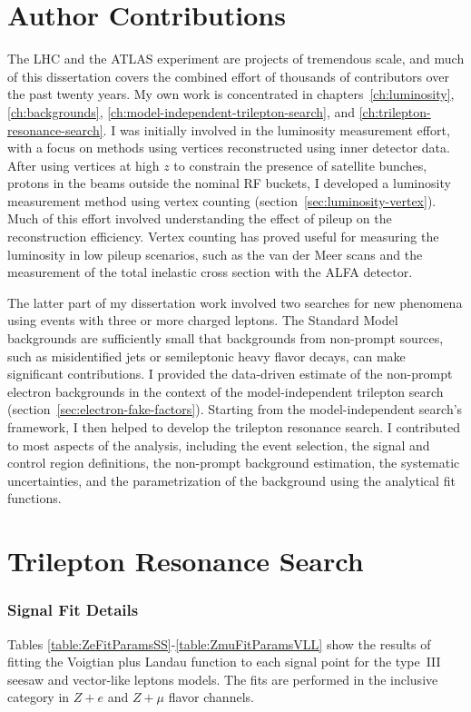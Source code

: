 \begin{appendices}

\chapter{Author Contributions}
The LHC and the ATLAS experiment are projects of tremendous scale, and much of this dissertation covers the combined effort of thousands of contributors over the past twenty years. My own work is concentrated in chapters~\ref{ch:luminosity}, \ref{ch:backgrounds}, \ref{ch:model-independent-trilepton-search}, and \ref{ch:trilepton-resonance-search}. I was initially involved in the luminosity measurement effort, with a focus on methods using vertices reconstructed using inner detector data. After using vertices at high $z$ to constrain the presence of satellite bunches, protons in the beams outside the nominal RF buckets, I developed a luminosity measurement method using vertex counting (section~\ref{sec:luminosity-vertex}). Much of this effort involved understanding the effect of pileup on the reconstruction efficiency. Vertex counting has proved useful for measuring the luminosity in low pileup scenarios, such as the van der Meer scans and the measurement of the total inelastic cross section with the ALFA detector. 

The latter part of my dissertation work involved two searches for new phenomena using events with three or more charged leptons. The Standard Model backgrounds are sufficiently small that backgrounds from non-prompt sources, such as misidentified jets or semileptonic heavy flavor decays, can make significant contributions. I provided the data-driven estimate of the non-prompt electron backgrounds in the context of the model-independent trilepton search (section~\ref{sec:electron-fake-factors}). Starting from the model-independent search's framework, I then helped to develop the trilepton resonance search. I contributed to most aspects of the analysis, including the event selection, the signal and control region definitions, the non-prompt background estimation, the systematic uncertainties, and the parametrization of the background using the analytical fit functions.

\chapter{Trilepton Resonance Search}\label{sec:appendix-resonance}

\subsection{Signal Fit Details}\label{sec:appendix-resonance-signal-fits}
Tables \ref{table:ZeFitParamsSS}-\ref{table:ZmuFitParamsVLL} show the results of fitting the Voigtian plus Landau function to each signal point for the type~III seesaw and vector-like leptons models. The fits are performed in the inclusive category in $Z+e$ and $Z+\mu$ flavor channels.  



\end{appendices}
